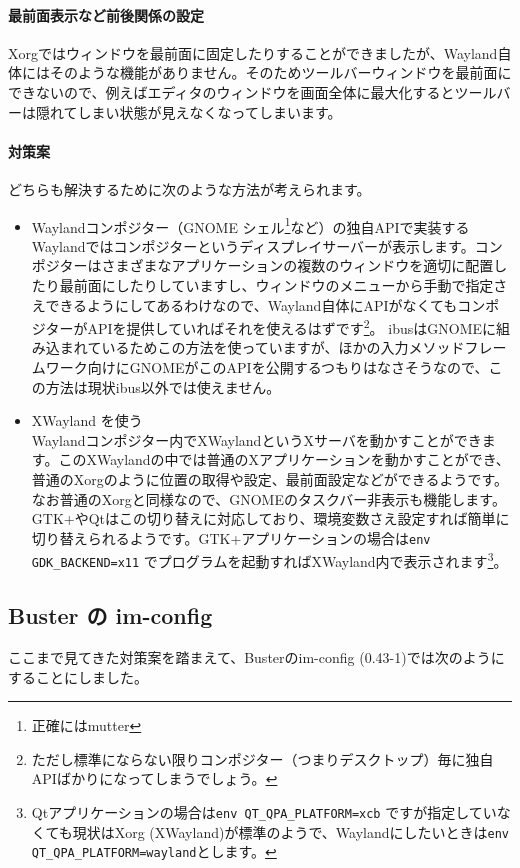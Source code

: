 \documentclass[mingoth,a4paper]{jsarticle}
\begin{document}
\paragraph{最前面表示など前後関係の設定} Xorgではウィンドウを最前面に固定したりすることができましたが、Wayland自体にはそのような機能がありません。そのためツールバーウィンドウを最前面にできないので、例えばエディタのウィンドウを画面全体に最大化するとツールバーは隠れてしまい状態が見えなくなってしまいます。

\paragraph{対策案} どちらも解決するために次のような方法が考えられます。
\begin{itemize}
 \item Waylandコンポジター（GNOME シェル\footnote{正確にはmutter}など）の独自APIで実装する\\
       Waylandではコンポジターというディスプレイサーバーが表示します。コンポジターはさまざまなアプリケーションの複数のウィンドウを適切に配置したり最前面にしたりしていますし、ウィンドウのメニューから手動で指定さえできるようにしてあるわけなので、Wayland自体にAPIがなくてもコンポジターがAPIを提供していればそれを使えるはずです\footnote{ただし標準にならない限りコンポジター（つまりデスクトップ）毎に独自APIばかりになってしまうでしょう。}。
ibusはGNOMEに組み込まれているためこの方法を使っていますが、ほかの入力メソッドフレームワーク向けにGNOMEがこのAPIを公開するつもりはなさそうなので、この方法は現状ibus以外では使えません。
 \item XWayland を使う\\
Waylandコンポジター内でXWaylandというXサーバを動かすことができます。このXWaylandの中では普通のXアプリケーションを動かすことができ、普通のXorgのように位置の取得や設定、最前面設定などができるようです。なお普通のXorgと同様なので、GNOMEのタスクバー非表示も機能します。GTK+やQtはこの切り替えに対応しており、環境変数さえ設定すれば簡単に切り替えられるようです。GTK+アプリケーションの場合は\verb|env GDK_BACKEND=x11| でプログラムを起動すればXWayland内で表示されます\footnote{Qtアプリケーションの場合は\texttt{env QT\_QPA\_PLATFORM=xcb} ですが指定していなくても現状はXorg (XWayland)が標準のようで、Waylandにしたいときは\texttt{env QT\_QPA\_PLATFORM=wayland}とします。}。
\end{itemize}

\subsection{Buster の im-config}
ここまで見てきた対策案を踏まえて、Busterのim-config (0.43-1)では次のようにすることにしました。
\end{document}
